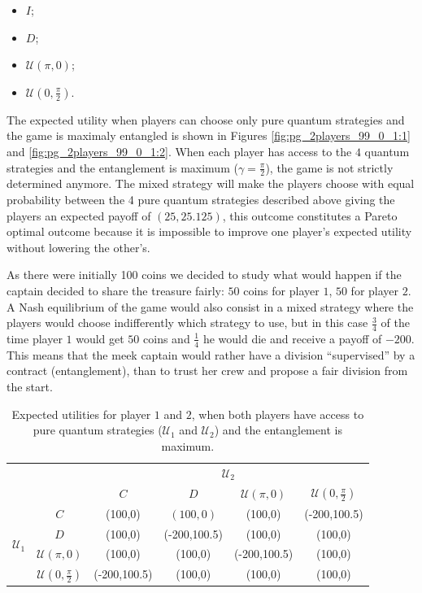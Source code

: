 \documentclass[10pt]{llncs}
\begin{document}
\begin{itemize}

\item $I$;

\item $D$;

\item $\mathcal{U}( \pi, 0)$;
\item $\mathcal{U}( 0, \frac{\pi}{2})$.

\end{itemize}

The expected utility when players can choose only pure quantum strategies and the game is maximaly entangled is shown in Figures \ref{fig:pg_2players_99_0_1:1} and \ref{fig:pg_2players_99_0_1:2}. When each player has access to the $4$ quantum strategies and the entanglement is maximum ($\gamma=\frac{\pi}{2}$), the game is not strictly determined anymore. The mixed strategy will make the players choose with equal probability between the 4 pure quantum strategies described above giving the players an expected payoff of $(25, 25.125)$, this outcome constitutes a Pareto optimal outcome because it is impossible to improve one player's expected utility without lowering the other's. 





As there were initially 100 coins we decided to study what would happen if the captain decided to share the treasure fairly: $50$ coins for player $1$, $50$ for player $2$. A Nash equilibrium of the game would also consist in a mixed strategy where the players would choose indifferently which strategy to use, but in this case $\frac{3}{4}$ of the time player $1$ would get $50$ coins and $\frac{1}{4}$ he would die and receive a payoff of $-200$. This means that the meek captain would rather have a division ``supervised'' by a contract (entanglement), than to trust her crew and propose a fair division from the start.




\begin{table}[h]
\begin{tabular}{|c|c|c|c|c|c|}
\cline{3-6} 
\multicolumn{1}{c}{} &  & \multicolumn{4}{c|}{$\mathcal{U}_{2}$}\tabularnewline
\cline{3-6} 
\multicolumn{1}{c}{} &  & $C$ & $D$ & $\mathcal{U}(\pi,0)$ & $\mathcal{U}(0,\frac{\pi}{2})$\tabularnewline
\hline 
\multirow{4}{*}{$\mathcal{U}_{1}$} & $C$ & (100,0) & $(100,0)$ & (100,0) & (-200,100.5)\tabularnewline
\cline{2-6} 
 & $D$ & (100,0) & (-200,100.5) & (100,0) & (100,0)\tabularnewline
\cline{2-6} 
 & $\mathcal{U}(\pi,0)$ & (100,0) & (100,0) & (-200,100.5) & (100,0)\tabularnewline
\cline{2-6} 
 & $\mathcal{U}(0,\frac{\pi}{2})$ & (-200,100.5) & (100,0) & (100,0) & (100,0)\tabularnewline
\hline 
\end{tabular}
\caption{Expected utilities for player $1$ and $2$, when both players have access to pure quantum strategies ($\mathcal{U}_{1}$ and $\mathcal{U}_{2}$) and the entanglement is maximum.}
\label{tab:quntico2jogadores_analise}
\end{table}
\end{document}
